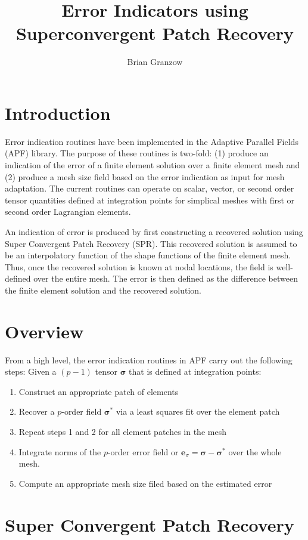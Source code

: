\documentclass{article}
\title{Error Indicators using Superconvergent Patch Recovery}
\author{Brian Granzow}
\begin{document}
\maketitle

\section{Introduction}
Error indication routines have been implemented in the Adaptive Parallel 
Fields (APF) library. The purpose of these routines is two-fold: (1) 
produce an indication of the error of a finite element solution over a 
finite element mesh and (2) produce a mesh size field based on the error 
indication as input for mesh adaptation. The current routines can operate
on scalar, vector, or second order tensor quantities defined at integration
points for simplical meshes with first or second order Lagrangian elements.

An indication of error is produced by first constructing a recovered 
solution using Super Convergent Patch Recovery (SPR). This recovered 
solution is assumed to be an interpolatory function of the shape functions
of the finite element mesh. Thus, once the recovered solution is known at
nodal locations, the field is well-defined over the entire mesh. The error 
is then defined as the difference between the finite element solution and 
the recovered solution.

\section{Overview}
From a high level, the error indication routines in APF carry out the
following steps: Given a $(p-1)$ tensor $\boldsymbol{\sigma}$ that is 
defined at integration points:
\begin{enumerate}
\item Construct an appropriate patch of elements
\item Recover a $p$-order field $\boldsymbol{\sigma}^*$ via 
a least squares fit over the element patch
\item Repeat steps 1 and 2 for all element patches in the mesh
\item Integrate norms of the $p$-order error field
or $\textbf{e}_\sigma = \boldsymbol{\sigma} - \boldsymbol{\sigma}^*$
over the whole mesh.
\item Compute an appropriate mesh size filed based on the estimated
error
\end{enumerate}

\section{Super Convergent Patch Recovery}
\end{document}
